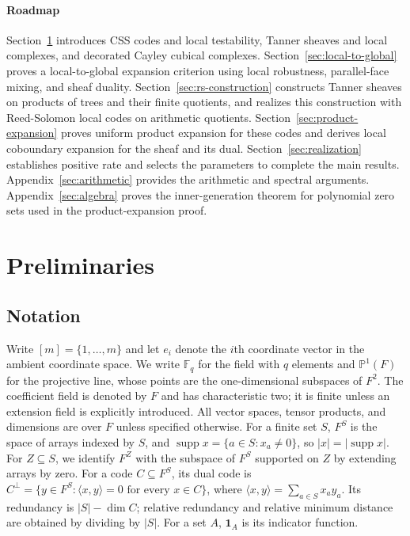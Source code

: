 \documentclass[11pt,letterpaper]{article}
\theoremstyle{definition}
\theoremstyle{remark}
\newcommand{\F}{\mathbb F}
\newcommand{\PP}{\mathbb P}
\newcommand{\supp}{\operatorname{supp}}
\newcommand{\one}{\mathbf 1}
\begin{document}
\paragraph{Roadmap}
Section~\ref{sec:preliminaries} introduces CSS codes and
local testability, Tanner sheaves and local complexes,
and decorated Cayley cubical complexes.
Section~\ref{sec:local-to-global} proves a local-to-global
expansion criterion using local robustness,
parallel-face mixing, and sheaf duality.
Section~\ref{sec:rs-construction} constructs Tanner sheaves
on products of trees and their finite quotients, and
realizes this construction with Reed-Solomon local codes
on arithmetic quotients.
Section~\ref{sec:product-expansion} proves uniform product
expansion for these codes and derives local coboundary
expansion for the sheaf and its dual.
Section~\ref{sec:realization} establishes positive rate
and selects the parameters to complete the main results.
Appendix~\ref{sec:arithmetic} provides the arithmetic
and spectral arguments.
Appendix~\ref{sec:algebra} proves the inner-generation
theorem for polynomial zero sets used in the
product-expansion proof.


\section{Preliminaries}
\label{sec:preliminaries}

\subsection{Notation}
Write $[m]=\{1,\ldots,m\}$ and let $e_i$ denote the $i$th
coordinate vector in the ambient coordinate space.
We write $\F_q$ for the field with $q$ elements and $\PP^1(F)$
for the projective line, whose points are the one-dimensional
subspaces of $F^2$.
The coefficient field is denoted by $F$ and has characteristic two;
it is finite unless an extension field is explicitly introduced.
All vector spaces, tensor products, and dimensions are over $F$
unless specified otherwise.
For a finite set $S$, $F^S$ is the space of arrays indexed by $S$,
and $\supp x=\{a\in S:x_a\ne0\}$, so $|x|=|\supp x|$.
For $Z\subseteq S$, we identify $F^Z$ with the subspace of $F^S$
supported on $Z$ by extending arrays by zero.
For a code $C\subseteq F^S$, its dual code is
$C^\perp=\{y\in F^S:\langle x,y\rangle=0\text{ for every }x\in C\}$,
where $\langle x,y\rangle=\sum_{a\in S}x_ay_a$.
Its redundancy is $|S|-\dim C$; relative redundancy and relative
minimum distance are obtained by dividing by $|S|$.
For a set $A$, $\one_A$ is its indicator function.
\end{document}
